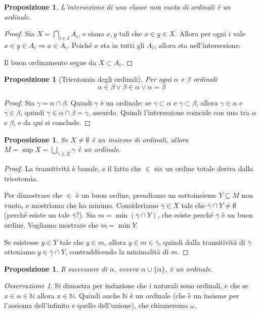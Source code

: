 \documentclass[a4paper,10pt,oneside]{article}
\theoremstyle{plain}
\newtheorem{myprop}[mytheorem]{Proposizione}
\theoremstyle{definition}
\theoremstyle{remark}
\newtheorem*{myobs}{Osservazione}
\begin{document}
\begin{myprop}
L'intersezione di una classe non vuota di ordinali è un ordinale.
\end{myprop}
\begin{proof}
 Sia $X=\bigcap_{i\in I}A_i$, e siano $x,y$ tali che $x\in y \in X$. Allora per ogni $i$ vale $x\in y \in A_i \Rightarrow x\in A_i$. Poiché $x$ sta in tutti gli $A_i$, allora sta nell'intersezione. 
 
 Il buon ordinamento segue da $X\subset A_i$.
\end{proof}
\begin{myprop}[Tricotomia degli ordinali]
 Per ogni $\alpha$ e $\beta$ ordinali \[\alpha \in \beta \vee \beta \in \alpha \vee \alpha=\beta\]
\end{myprop}
\begin{proof}
 Sia $\gamma = \alpha \cap \beta$. Quindi $\gamma$ è un ordinale: se $\gamma \subset \alpha$ e $\gamma \subset \beta$, allora $\gamma \in \alpha$ e $\gamma \in \beta$, quindi $\gamma \in \alpha \cap \beta = \gamma$, assurdo. Quindi l'intersezione coincide con uno tra $\alpha$ e $\beta$, e da qui si conclude.
\end{proof}

\begin{myprop}
 Se $X\ne \emptyset$ è un insieme di ordinali, allora $M = \sup X=\bigcup_{\gamma \in X}\gamma$ è un ordinale.
\end{myprop}
\begin{proof}
 La transitività è banale, e il fatto che $\in$ sia un ordine totale deriva dalla tricotomia.
 
 Per dimostrare che $\in$ è un buon ordine, prendiamo un sottoinsieme $Y \subseteq M$ non vuoto, e mostriamo che ha minimo. Consideriamo $\bar\gamma \in X$ tale che $\bar\gamma \cap Y \ne \emptyset$ (perché esiste un tale $\bar\gamma$?). Sia $m=\min (\bar\gamma\cap Y)$, che esiste perché $\bar\gamma$ è un buon ordine. Vogliamo mostrare che $m=\min Y$.
 
 Se esistesse $y\in Y$ tale che $y\in m$, allora $y\in m \in \bar\gamma$, quindi dalla transitività di $\bar\gamma$ otteniamo $y \in \bar\gamma\cap Y$, contraddicendo la minimalità di $m$.
\end{proof}

\begin{myprop}
  Il successore di $\alpha$, ovvero $\alpha \cup \{\alpha\}$, è un ordinale.
\end{myprop}


\begin{myobs}
 Si dimostra per induzione che i naturali sono ordinali, e che se $x\in n\in\mathbb N$ allora $x\in\mathbb N$. Quindi anche $\mathbb N$ è un ordinale (che è un insieme per l'assioma dell'infinito e quello dell'unione), che chiameremo $\omega$. 
\end{myobs}
\end{document}
